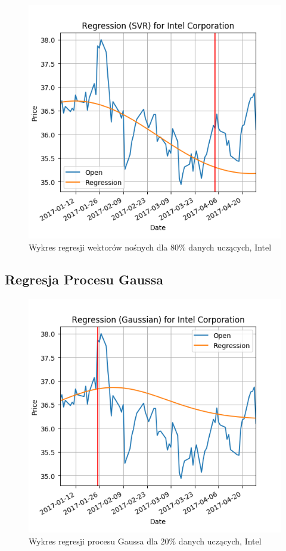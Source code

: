 \begin{figure}[h!]
\centering
\includegraphics[width=150mm]{pictures/plots/intel_svr_80.png}
\caption{Wykres regresji wektorów nośnych dla 80\% danych uczących, Intel}
\label{fig:Wykres regresji wektorów nośnych dla 80\% danych uczących, Intel}
\end{figure}

\subsection{Regresja Procesu Gaussa}

\begin{figure}[h!]
\centering
\includegraphics[width=150mm]{pictures/plots/intel_gpr_20.png}
\caption{Wykres regresji procesu Gaussa dla 20\% danych uczących, Intel}
\label{fig:Wykres regresji procesu Gaussa dla 20\% danych uczących, Intel}
\end{figure}

